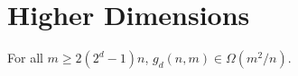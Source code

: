 \documentclass{patmorin}
\DeclareMathOperator{\x}{x}
\DeclareMathOperator{\len}{len}
\DeclareMathOperator{\skp}{skip}
\begin{document}
%
%
%

\section{Higher Dimensions}

\begin{thm}
  For all $m\ge 2(2^d-1)n$, $g_d(n,m)\in\Omega(m^2/n)$.
\end{thm}
\end{document}
